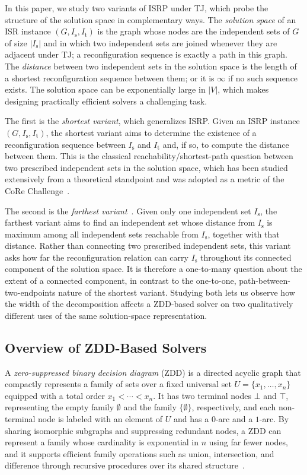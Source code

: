 \documentclass[conference]{IEEEtran}
\newcommand{\ini}{\mathrm{s}}
\newcommand{\tar}{\mathrm{t}}
\begin{document}
In this paper, we study two variants of ISRP under TJ, which probe the structure
of the solution space in complementary ways.
The \emph{solution space} of an ISR instance $(G, I_\ini, I_\tar)$ is the graph whose nodes are the
independent sets of $G$ of size $|I_\ini|$ and in which two independent sets are
joined whenever they are adjacent under TJ; a reconfiguration sequence is exactly
a path in this graph. The \emph{distance} between two independent sets in the
solution space is the length of a shortest reconfiguration sequence between them;
or it is $\infty$ if no such sequence exists. The solution space can be exponentially
large in $|V|$, which makes designing practically efficient solvers a challenging
task.

The first is the \emph{shortest variant}, which generalizes ISRP.
Given an ISRP instance $(G, I_\ini, I_\tar)$, the shortest variant aims to
determine the existence of a reconfiguration sequence between $I_\ini$ and
$I_\tar$ and, if so, to compute the distance between them. This is the classical
reachability/shortest-path question between two prescribed independent sets in the solution space,
which has been studied extensively from a theoretical standpoint and was adopted
as a metric of the CoRe Challenge~\cite{sotaokit24}.

The second is the \emph{farthest variant}~\cite{ItoKNSSTT23}.
Given only one independent set $I_\ini$, the farthest variant aims to find an
independent set whose distance from $I_\ini$ is maximum among all independent
sets reachable from $I_\ini$, together with that distance. Rather than connecting
two prescribed independent sets, this variant asks how far the reconfiguration
relation can carry $I_\ini$ throughout its connected component of the solution
space. It is therefore a one-to-many question about the extent of a connected
component, in contrast to the one-to-one, path-between-two-endpoints nature of
the shortest variant. Studying both lets us observe how the width of the decomposition affects a
ZDD-based solver on two qualitatively different uses of the same solution-space
representation.

\subsection{Overview of ZDD-Based Solvers}
\label{subsec:zdd_solver}

A \emph{zero-suppressed binary decision diagram} (ZDD) is a directed acyclic
graph that compactly represents a family of sets over a fixed universal set
$U = \{x_1, \dots, x_n\}$ equipped with a total order $x_1 < \cdots < x_n$.
It has two terminal nodes $\bot$ and $\top$, representing the empty family
$\emptyset$ and the family $\{\emptyset\}$, respectively, and each non-terminal
node is labeled with an element of $U$ and has a $0$-arc and a $1$-arc.
By sharing isomorphic subgraphs and suppressing redundant nodes, a ZDD can
represent a family whose cardinality is exponential in $n$ using far fewer
nodes, and it supports efficient family operations such as union,
intersection, and difference through recursive procedures over its shared
structure~\cite{Minato1993,knuth:taocp41}.
\end{document}
